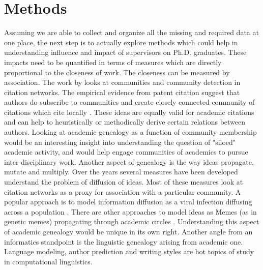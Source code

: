 \documentclass[a4paper]{article}
\begin{document}


\section{Methods}

Assuming we are able to collect and organize all the missing and required data at one place, the next step is to actually explore methods which could help in understanding influence and impact of supervisors on Ph.D. graduates. These impacts need to be quantified in terms of measures which are directly proportional to the closeness of work.
The closeness can be measured by association. The work by \cite{fortunato2010community} \cite{blondel2008fast} looks at communities and community detection in citation networks. The empirical evidence from patent citation suggest that authors do subscribe to communities and create closely connected community of citations which cite locally \cite{10.2307/2118401}. These ideas are equally valid for academic citations and can help to heuristically or methodically derive certain relations between authors. Looking at academic genealogy as a function of community membership would be an interesting insight into understanding the question of "siloed" academic activity, and would help engage communities of academics to pursue inter-disciplinary work.
Another aspect of genealogy is the way ideas propagate, mutate and multiply. Over the years several measures have been developed understand the problem of diffusion of ideas. Most of these measures look at citation networks as a proxy for association with a particular community. A popular approach is to model information diffusion as a viral infection diffusing across a population \cite{cheng2014can,pei2015exploring}. There are other approaches to model ideas as Memes (as in genetic memes) propagating through academic circles \cite{myers2012information}. Understanding this aspect of academic genealogy would be unique in its own right.
Another angle from an informatics standpoint is the linguistic genealogy arising from academic one. Language modeling, author prediction and writing styles are hot topics of study in computational linguistics.
\end{document}
